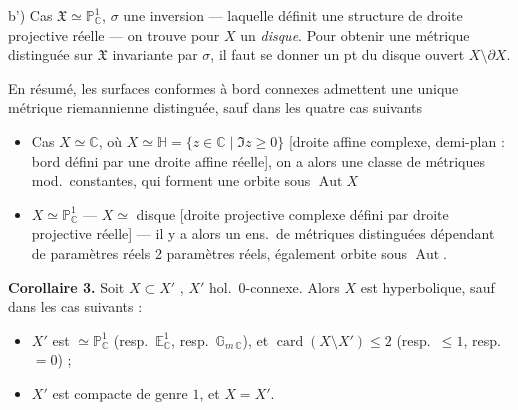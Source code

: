 \documentclass[11pt,a4paper]{article}
\begin{document}
b') Cas $\mathfrak{X} \simeq \mathbb{P}^{1}_{\mathbb{C}}$, $\sigma$ une inversion --- laquelle définit une structure de droite projective réelle --- on trouve \struck{\ill{}} pour $X$ un \emph{disque}. Pour obtenir une métrique distinguée sur $\mathfrak{X}$ invariante par $\sigma$, il faut se donner un pt du disque ouvert $X \setminus \partial X$.


En résumé, les surfaces conformes à bord connexes admettent une unique métrique riemannienne distinguée, sauf dans les quatre cas suivants
\begin{itemize}
  \item[a) a')] Cas $X \simeq \mathbb{C}$, où $X \simeq \mathbb{H} = \{z \in \mathbb{C} \mid \Im z \geq 0\}$ [droite affine complexe, demi-plan : bord défini par une droite affine réelle], on a alors une classe de métriques mod.\ constantes, qui forment une orbite sous $\operatorname{Aut} X$
  \item[b) b')] $X \simeq \mathbb{P}^{1}_{\mathbb{C}}$ --- $X \simeq$ disque [droite projective complexe \struck{\ill{}} défini par droite projective réelle] --- il y a alors un ens.\ de métriques distinguées dépendant de  paramètres réels \ill{}  2 paramètres réels, également orbite sous $\operatorname{Aut}$.
\end{itemize}

\textbf{Corollaire 3.} Soit $X \subset X'$ , $X'$ hol.\ 0-connexe. Alors $X$ est hyperbolique, sauf dans les cas suivants :
\begin{itemize}
  \item[a)] $X'$ est $\simeq \mathbb{P}^{1}_{\mathbb{C}}$ (resp.\ $\mathbb{E}^{1}_{\mathbb{C}}$, resp.\ $\mathbb{G}_{m\,\mathbb{C}}$), et $\operatorname{card}(X \setminus X') \leq 2$ (resp.\ $\leq 1$, resp.\ $= 0$) ;
  \item[b)] $X'$ est compacte de genre $1$, et $X = X'$.
\end{itemize}
\end{document}
